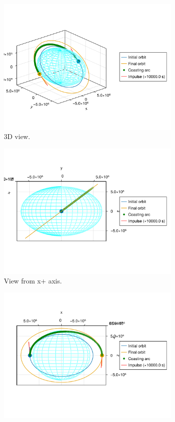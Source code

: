 \begin{figure}[htbp]
    \centering
    \begin{subfigure}{0.49\linewidth}
        \includegraphics[width=0.8\linewidth]{../results/j2/hohmann/CICICIC_3d.png}
        \caption{3D view.}
    \end{subfigure}
    \begin{subfigure}{0.49\linewidth}
        \includegraphics[width=0.8\linewidth]{../results/j2/hohmann/CICICIC_x+.png}
        \caption{View from x+ axis.}
    \end{subfigure}
    \begin{subfigure}{0.49\linewidth}
        \includegraphics[width=0.8\linewidth]{../results/j2/hohmann/CICICIC_y+.png}

\end{subfigure}
\end{figure}
